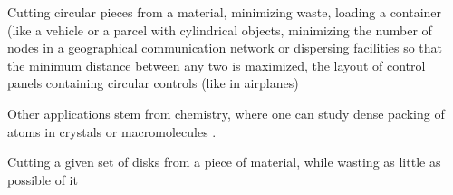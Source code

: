 Cutting circular pieces from a material, minimizing waste, loading a container (like a vehicle or a parcel with cylindrical objects, minimizing the number of nodes in a geographical communication network or dispersing facilities so that the minimum distance between any two is maximized, the layout of control panels containing circular controls (like in airplanes) \parencite{CKP2008solving}

Other applications stem from chemistry, where one can study dense packing of atoms in crystals or macromolecules \cite{WMP1994history}.

Cutting a given set of disks from a piece of material, while wasting as little as possible of it \cite{SMCSCG2007new}


%

